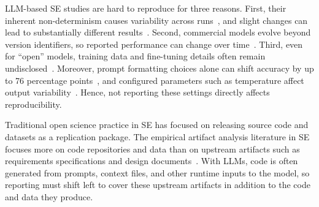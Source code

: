 LLM-based SE studies are hard to reproduce for three reasons.
First, their inherent non-determinism causes variability across runs~\cite{DBLP:conf/naacl/SongWLL25, DBLP:journals/corr/abs-2602-07150}, and slight changes can lead to substantially different results~\cite{DBLP:conf/nips/AgarwalSCCB21, DBLP:journals/corr/abs-2412-12509}.
Second, commercial models evolve beyond version identifiers, so reported performance can change over time~\cite{DBLP:journals/corr/abs-2307-09009}.
Third, even for ``open'' models, training data and fine-tuning details often remain undisclosed~\cite{Gibney2024}.
Moreover, prompt formatting choices alone can shift accuracy by up to 76 percentage points~\cite{DBLP:conf/iclr/Sclar0TS24}, and configured parameters such as temperature affect output variability~\cite{renze2024temperature}.
Hence, not reporting these settings directly affects reproducibility.

Traditional open science practice in SE has focused on releasing source code and datasets as a replication package. The empirical artifact analysis literature in SE focuses more on code repositories and data than on upstream artifacts such as requirements specifications and design documents~\cite{DBLP:journals/jss/LiuHHXZJCM24}. With LLMs, code is often generated from prompts, context files, and other runtime inputs to the model, so reporting must shift left to cover these upstream artifacts in addition to the code and data they produce.

